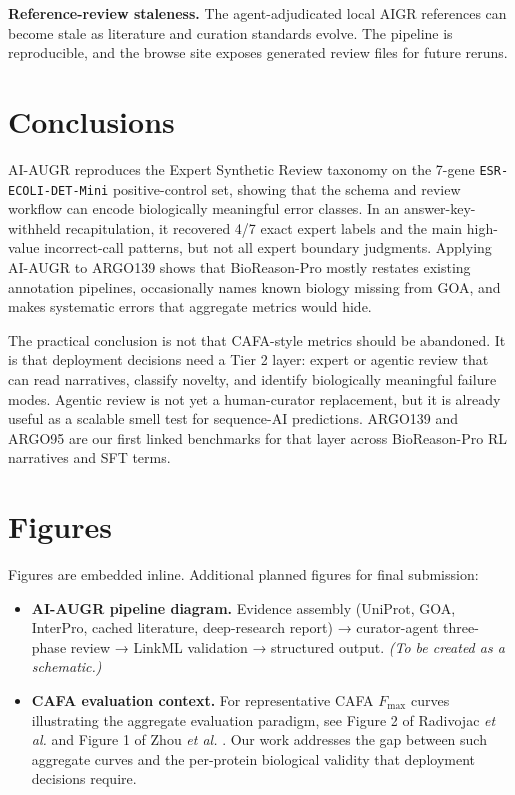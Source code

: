 \documentclass[
  11pt,
]{article}
\providecommand{\tightlist}{%
  \setlength{\itemsep}{0pt}\setlength{\parskip}{0pt}}
\begin{document}
\textbf{Reference-review staleness.} The agent-adjudicated local AIGR
references can become stale as literature and curation standards evolve.
The pipeline is reproducible, and the browse site exposes generated review files for
future reruns.

\hypertarget{conclusions}{%
\section{Conclusions}\label{conclusions}}

AI-AUGR reproduces the Expert Synthetic Review taxonomy on the 7-gene
\texttt{ESR-ECOLI-DET-Mini} positive-control set, showing that the
schema and review workflow can encode biologically meaningful error
classes. In an answer-key-withheld recapitulation, it recovered 4/7
exact expert labels and the main high-value incorrect-call patterns, but
not all expert boundary judgments. Applying AI-AUGR to ARGO139 shows that
BioReason-Pro mostly restates existing annotation pipelines,
occasionally names known biology missing from GOA, and makes systematic
errors that aggregate metrics would hide.

The practical conclusion is not that CAFA-style metrics should be
abandoned. It is that deployment decisions need a Tier 2 layer: expert
or agentic review that can read narratives, classify novelty, and
identify biologically meaningful failure modes. Agentic review is not
yet a human-curator replacement, but it is already useful as a scalable
smell test for sequence-AI predictions. ARGO139 and ARGO95 are our first
linked benchmarks for that layer across BioReason-Pro RL narratives and
SFT terms.

\hypertarget{figures}{%
\section{Figures}\label{figures}}

Figures are embedded inline. Additional planned figures for final
submission:

\begin{itemize}
\tightlist
\item
  \textbf{AI-AUGR pipeline diagram.} Evidence assembly (UniProt, GOA,
  InterPro, cached literature, deep-research report) → curator-agent
  three-phase review → LinkML validation → structured output. \emph{(To
  be created as a schematic.)}
\item
  \textbf{CAFA evaluation context.} For representative CAFA \(F_{\max}\)
  curves illustrating the aggregate evaluation paradigm, see Figure 2 of
  Radivojac \emph{et al.} \cite{radivojac2013} and Figure 1 of Zhou \emph{et al.}
  \cite{zhou2019}. Our work addresses the gap between such aggregate curves and
  the per-protein biological validity that deployment decisions require.
\end{itemize}
\end{document}
